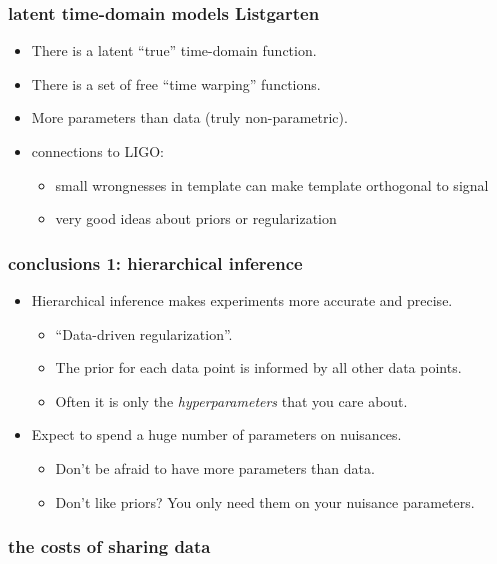 \documentclass[pdftex]{beamer}
\begin{document}
\begin{frame}
Listgarten \etal}}
  [CHROMATOGRAPHY FIGURE HERE]
\end{frame}

\begin{frame}
  \frametitle{latent time-domain models {\small Listgarten \etal}}
  \begin{itemize}
  \item There is a latent ``true'' time-domain function.
  \item There is a set of free ``time warping'' functions.
  \item More parameters than data (truly non-parametric).
  \item connections to LIGO:
    \begin{itemize}
    \item small wrongnesses in template can make template orthogonal to signal
    \item very good ideas about priors or regularization
    \end{itemize}
  \end{itemize}
\end{frame}

\begin{frame}
  \frametitle{conclusions 1: hierarchical inference}
  \begin{itemize}
  \item Hierarchical inference makes experiments more accurate and precise.
    \begin{itemize}
    \item ``Data-driven regularization''.
    \item The prior for each data point is informed by all other data points.
    \item Often it is only the \emph{hyperparameters} that you care about.
    \end{itemize}
  \item Expect to spend a huge number of parameters on nuisances.
    \begin{itemize}
    \item Don't be afraid to have more parameters than data.
    \item Don't like priors?  You only need them on your nuisance parameters.
    \end{itemize}
  \end{itemize}
\end{frame}

\begin{frame}
  \frametitle{the costs of sharing data}
\end{frame}
\end{document}
